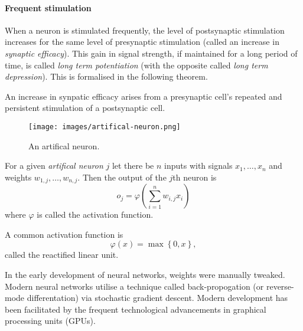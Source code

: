 \paragraph{Frequent stimulation}
When a neuron is stimulated frequently, the level of postsynaptic stimulation
increases for the same level of presynaptic stimulation (called an increase in 
\emph{synaptic efficacy}).
This gain in signal strength, if maintained for a long period of time,
is called \emph{long term potentiation} (with the opposite called
\emph{long term depression}).
This is formalised in the following theorem.

\begin{theorem}
	An increase in synpatic efficacy arises from a presynaptic cell's
	repeated and persistent stimulation of a postsynaptic cell.
\end{theorem}

\begin{figure}
	\centering
	\texttt{[image: images/artifical-neuron.png]}
	\caption{An artifical neuron.}
	\label{fig:artificial-neuron}
\end{figure}

\begin{definition}
	For a given \emph{artifical neuron} $j$ let there be $n$ inputs with signals
	$x_1, \ldots, x_n$ and weights $w_{1,j}, \ldots, w_{n,j}$. 
	Then the output of the $j$th neuron is
	\[
		o_j = \varphi\left( \sum_{i = 1}^n w_{i,j} x_i \right)
	\]
	where $\varphi$ is called the activation function.
\end{definition}

\begin{example}
	A common activation function is
	\[
		\varphi(x) = \max\left\{ 0, x \right\},
	\]
	called the reactified linear unit.
\end{example}

\begin{remark}
	In the early development of neural networks, weights were manually tweaked.
	Modern neural networks utilise a technique called back-propogation
	(or reverse-mode differentation) via stochastic gradient descent.
	Modern development has been facilitated by the frequent technological 
	advancements in graphical processing units (GPUs).
\end{remark}

